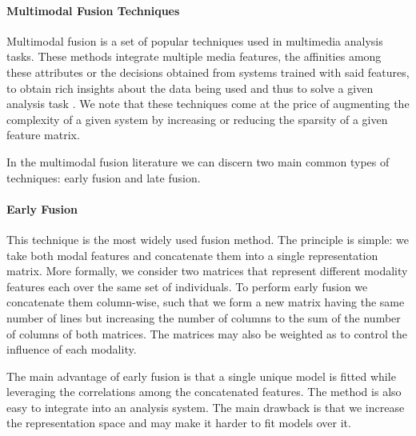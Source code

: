 \paragraph{Multimodal Fusion Techniques}
Multimodal fusion is a set of popular techniques used in multimedia analysis tasks. T\textit{}hese methods integrate multiple media features, the affinities among these attributes or the decisions obtained from systems trained with said features, to obtain rich insights about the data being used and thus to solve a given analysis  task \cite{AtreyHEK10}. We note that these techniques come at the price of augmenting the complexity of a given system by increasing or reducing the sparsity of a given feature matrix.


In the multimodal fusion literature we can discern two main common types of techniques: early fusion and late fusion. 
\paragraph{Early Fusion}
This technique is the most widely used fusion method. The principle is simple: we take both modal features and concatenate them into a single representation matrix. More formally, we consider two matrices  that represent different modality features each  over the same set of individuals. To perform early fusion we concatenate them column-wise, such that we form a new matrix having the same number of lines but increasing the number of columns to the sum of the number of columns of both matrices. The matrices may also be weighted as to control the influence of each modality.

The main advantage of early fusion is that a single unique model is fitted while leveraging the correlations among the concatenated features. The method is also easy to integrate into an analysis system. The main drawback is that we increase the representation space and may make it harder to fit models over it.
%


%
